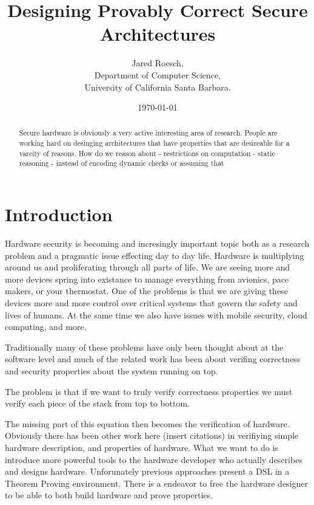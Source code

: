 \documentclass[12pt, titlepage]{article}
\title{Designing Provably Correct Secure Architectures}
\author{Jared Roesch,  \\
    Department of Computer Science, \\
    University of California Santa Barbara. \\
    }
\date{\today}
\begin{document}
\maketitle

\begin{abstract}
Secure hardware is obviously a very active interesting area of research.
People are working hard on desinging architectures that have properties
that are desireable for a vareity of reasons.
How do we reason about \cite{exec-leases}
- restrictions on computation
- static reasoning
- instead of encoding dynamic checks or assuming that

\end{abstract}


\section{Introduction}

Hardware security is becoming and incresingly important topic both as a research problem and a pragmatic issue effecting 
day to day life. Hardware is multiplying around us and proliferating through all parts of life. We are seeing more and more
devices spring into existance to manage everything from avionics, pace makers, or your thermostat. One of the problems is
that we are giving these devices more and more control over critical systems that govern the safety and lives of humans. At
the same time we also have issues with mobile security, cloud computing, and more.

Traditionally many of these problems have only been thought about at the software level and much of the related work has
been about verifing correctness and security properties about the system running on top.

The problem is that if we want to truly verify correctness properties we must verify each piece of the stack from top to 
bottom.

The missing part of this equation then becomes the verification of hardware. Obviously there has been other work here 
(insert citations) in verifiying simple hardware description, and properties of hardware. What we want to do is introduce
more powerful tools to the hardware developer who actually describes and designs hardware. Unforunately previous approaches
present a DSL in a Theorem Proving environment. There is a endeavor to free the hardware designer to be able to both build
hardware and prove properties.
\end{document}
